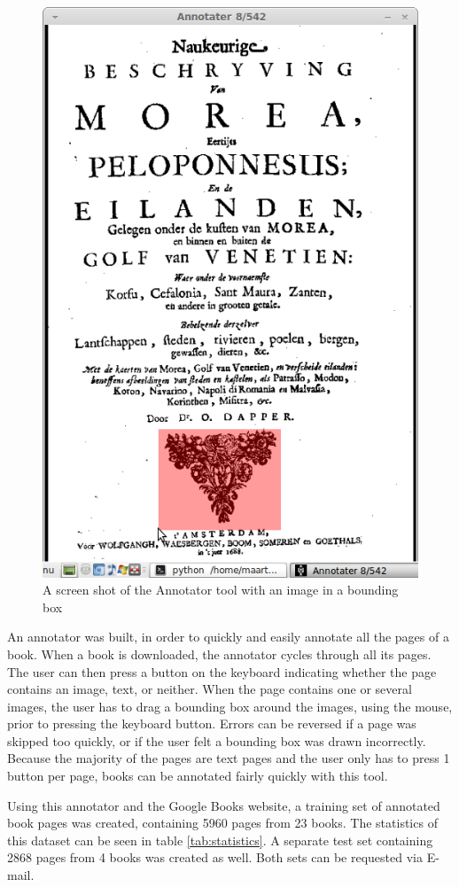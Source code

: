 \begin{figure}
\vspace{-0.5cm}
\centering
    \includegraphics[width=\textwidth]{resources/screenshotAnnotator}
    \caption{A screen shot of the Annotator tool with an image in a bounding box}
    \label{fig:ann}
\end{figure}

An annotator was built, in order to quickly and easily annotate all the pages of
a book. When a book is downloaded, the annotator cycles through all its pages.
The user can then press a button on the keyboard indicating whether the page
contains an image, text, or neither. When the page contains one or several
images, the user has to drag a bounding box around the images, using the mouse,
prior to pressing the keyboard button. Errors can be reversed if a page was
skipped too quickly, or if the user felt a bounding box was drawn incorrectly.
Because the majority of the pages are
text pages and the user only has to press 1 button per page, books can be
annotated fairly quickly with this tool.

Using this annotator and the Google Books website, a training set of annotated
book pages was created, containing 5960 pages from 23 books. The statistics of
this dataset can be seen in table \ref{tab:statistics}. A separate test set
containing 2868 pages from 4 books was created as well. Both sets can be
requested via E-mail.



